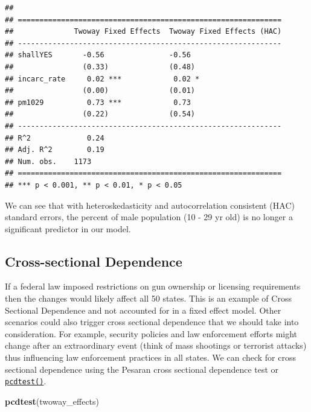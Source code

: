 \documentclass[]{article}
\newenvironment{Shaded}{\begin{snugshade}}{\end{snugshade}}
\newcommand{\KeywordTok}[1]{\textcolor[rgb]{0.13,0.29,0.53}{\textbf{{#1}}}}
\newcommand{\NormalTok}[1]{{#1}}
\theoremstyle{definition}
\theoremstyle{definition}
\theoremstyle{remark}
\begin{document}
\begin{verbatim}
## 
## =============================================================
##              Twoway Fixed Effects  Twoway Fixed Effects (HAC)
## -------------------------------------------------------------
## shallYES       -0.56               -0.56                     
##                (0.33)              (0.48)                    
## incarc_rate     0.02 ***            0.02 *                   
##                (0.00)              (0.01)                    
## pm1029          0.73 ***            0.73                     
##                (0.22)              (0.54)                    
## -------------------------------------------------------------
## R^2             0.24                                         
## Adj. R^2        0.19                                         
## Num. obs.    1173                                            
## =============================================================
## *** p < 0.001, ** p < 0.01, * p < 0.05
\end{verbatim}

We can see that with heteroskedasticity and autocorrelation consistent
(HAC) standard errors, the percent of male population (10 - 29 yr old)
is no longer a significant predictor in our model.

\subsection{Cross-sectional
Dependence}\label{cross-sectional-dependence-1}

If a federal law imposed restrictions on gun ownership or licensing
requirements then the changes would likely affect all 50 states. This is
an example of Cross Sectional Dependence and not accounted for in a
fixed effect model. Other scenarios could also trigger cross sectional
dependence that we should take into consideration. For example, security
policies and law enforcement efforts might change after an extraordinary
event (think of mass shootings or terrorist attacks) thus influencing
law enforcement practices in all states. We can check for cross
sectional dependence using the Pesaran cross sectional dependence test
or \href{http://bit.ly/r_pcdtest}{\texttt{pcdtest()}}.

\begin{Shaded}
\begin{Highlighting}[]
\KeywordTok{pcdtest}\NormalTok{(twoway_effects)}
\end{Highlighting}
\end{Shaded}
\end{document}
